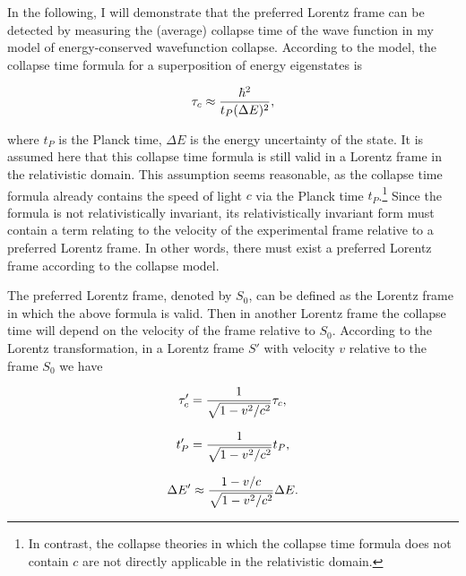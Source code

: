 In the following, I will demonstrate that the preferred Lorentz frame can be detected by measuring the (average) collapse time of the wave function in my model of energy-conserved wavefunction collapse. According to the model, the collapse time formula for a superposition of energy eigenstates is

\begin{equation}
\tau_c \approx {\hbar^2 \over {t_P (\Delta E)^2}},
\label{CT1}
\end{equation}

\noindent where $t_P$ is the Planck time, $\Delta E$ is the energy uncertainty of the state. It is assumed here that  this collapse time formula is still valid in a Lorentz frame in the relativistic domain. This assumption seems reasonable, as the collapse time formula already contains the speed of light $c$ via the Planck time $t_P$.\footnote{In contrast, the collapse theories in which the collapse time formula does not contain $c$ are not directly applicable in the relativistic domain.} Since the formula is not relativistically invariant, its relativistically invariant form must contain a term relating to the velocity of the experimental frame relative to a preferred Lorentz frame. In other words, there must exist a preferred Lorentz frame according to the collapse model. 

The preferred Lorentz frame, denoted by $S_0$, can be defined as the Lorentz frame in which the above formula is valid. Then in another Lorentz frame the collapse time will depend on the velocity of the frame relative to $S_0$. According to the Lorentz transformation, in a Lorentz frame $S'$ with velocity $v$ relative to the frame $S_0$ we have

\begin{equation}
\tau'_c={1 \over \sqrt{1-v^2/c^2} } \tau_c,
\label{}
\end{equation}

\begin{equation}
t'_P={1 \over \sqrt{1-v^2/c^2} } t_P,
\label{}
\end{equation}

\begin{equation}
\Delta E' \approx {{1-v/c} \over \sqrt{1-v^2/c^2} } \Delta E.
\label{E'E}
\end{equation}

